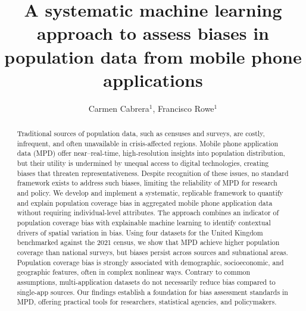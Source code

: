 \documentclass[]{rsos}%
\begin{document}
\title{A systematic machine learning approach to assess biases in population data from mobile phone applications}

\author{
Carmen Cabrera$^{1}$,
Francisco Rowe$^{1}$}

\address{
  $^{1}$Geographic Data Science Lab, Department of Geography and Planning, University of Liverpool, Liverpool, United Kingdom.\\
  $^{}$}
\subject{
Mobile phone data,
Human mobility,
Explainable AI,
Spatial analysis}



\begin{abstract}
Traditional sources of population data, such as censuses and surveys, are costly, infrequent, and often unavailable in crisis-affected regions. Mobile phone application data (MPD) offer near--real-time, high-resolution insights into population distribution, but their utility is undermined by unequal access to digital technologies, creating biases that threaten representativeness. Despite recognition of these issues, no standard framework exists to address such biases, limiting the reliability of MPD for research and policy. We develop and implement a systematic, replicable framework to quantify and explain population coverage bias in aggregated mobile phone application data without requiring individual-level attributes. The approach combines an indicator of population coverage bias with explainable machine learning to identify contextual drivers of spatial variation in bias. Using four datasets for the United Kingdom benchmarked against the 2021 census, we show that MPD achieve higher population coverage than national surveys, but biases persist across sources and subnational areas. Population coverage bias is strongly associated with demographic, socioeconomic, and geographic features, often in complex nonlinear ways. Contrary to common assumptions, multi-application datasets do not necessarily reduce bias compared to single-app sources. Our findings establish a foundation for bias assessment standards in MPD, offering practical tools for researchers, statistical agencies, and policymakers.
\end{abstract}
\end{document}

